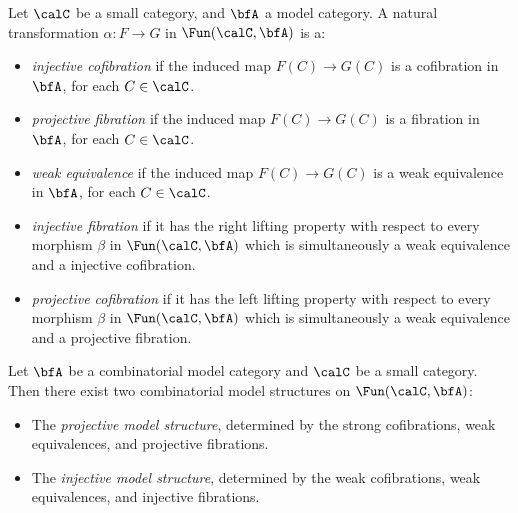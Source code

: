 \begin{definition}\label{injproj}\label{cooper}
Let $\calC$ be a small category, and $\bfA$ a model category.
A natural transformation $\alpha: F \rightarrow G$ in $\Fun(\calC, \bfA)$ is a:

\begin{itemize}
\item {\it injective cofibration} if the induced map $F(C) \rightarrow
G(C)$ is a cofibration in $\bfA$, for each $C \in \calC$.

\item {\it projective fibration} if the induced map $F(C) \rightarrow
G(C)$ is a fibration in $\bfA$, for each $C \in \calC$.

\item {\it weak equivalence} if the induced map $F(C) \rightarrow
G(C)$ is a weak equivalence in $\bfA$, for each $C \in \calC$.

\item {\it injective fibration} if it has the right lifting property
with respect to every morphism $\beta$ in $\Fun(\calC, \bfA)$ which is
simultaneously a weak equivalence and a injective cofibration.

\item {\it projective cofibration} if it has the left lifting property
with respect to every morphism $\beta$ in $\Fun(\calC, \bfA)$ which is
simultaneously a weak equivalence and a projective fibration.
\end{itemize}
\end{definition}

\begin{proposition}\label{smurff}
Let $\bfA$ be a combinatorial model category and $\calC$
be a small category. Then there exist two combinatorial model structures on $\Fun(\calC, \bfA)$:

\begin{itemize}
\item The {\it projective model structure}, determined by the strong
cofibrations, weak equivalences, and projective fibrations.

\item The {\it injective model structure}, determined by the weak
cofibrations, weak equivalences, and injective fibrations.
\end{itemize}
\end{proposition}


